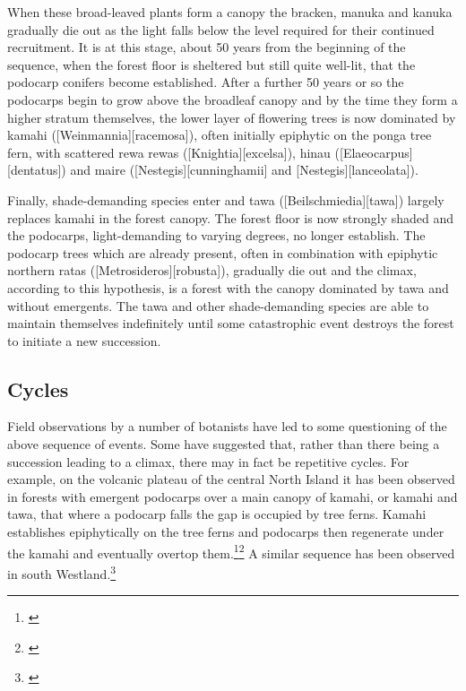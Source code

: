 When these broad-leaved plants form a canopy the bracken, manuka and kanuka gradually die out as the light falls below the level required for their continued recruitment.
It is at this stage, about 50 years from the beginning of the sequence, when the forest floor is sheltered but still quite well-lit, that the podocarp conifers become established.
After a further 50 years or so the podocarps begin to grow above the broadleaf canopy and by the time they form a higher stratum themselves, the lower layer of flowering trees is now dominated by kamahi ([Weinmannia][racemosa]), often initially epiphytic on the ponga tree fern, with scattered rewa rewas ([Knightia][excelsa]), hinau ([Elaeocarpus][dentatus]) and maire ([Nestegis][cunninghamii] and [Nestegis][lanceolata]).

Finally, shade-demanding species enter and tawa ([Beilschmiedia][tawa]) largely replaces kamahi in the forest canopy.
The forest floor is now strongly shaded and the podocarps, light-demanding to varying degrees, no longer establish.
The podocarp trees which are already present, often in combination with epiphytic northern ratas ([Metrosideros][robusta]), gradually die out and the climax, according to this hypothesis, is a forest with the canopy dominated by tawa and without emergents.
The tawa and other shade-demanding species are able to maintain themselves indefinitely until some catastrophic event destroys the forest to initiate a new succession.

\subsection[Cycles]{Cycles }

Field observations by a number of botanists have led to some questioning of the above sequence of events.
Some have suggested that, rather than there being a succession leading to a climax, there may in fact be repetitive cycles.
For example, on the volcanic plateau of the central North Island it has been observed in forests with emergent podocarps over a main canopy of kamahi, or kamahi and tawa, that where a podocarp falls the gap is occupied by tree ferns.
Kamahi establishes epiphytically on the tree ferns and podocarps then regenerate under the kamahi and eventually overtop them.\footnote{\cite{cameron1955mosaic}}\footnote{\cite{beveridge1973regeneration}} A similar sequence has been observed in south Westland.\footnote{\cite{poole1937survey}}

